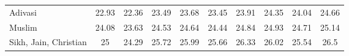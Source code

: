 \begin{table}[htbp]
\begin{tabular}{l*{9}{c}}
Adivasi             &       22.93&       22.36&       23.49&       23.68&       23.45&       23.91&       24.35&       24.04&       24.66\\
Muslim              &       24.08&       23.63&       24.53&       24.64&       24.44&       24.84&       24.93&       24.71&       25.14\\
Sikh, Jain, Christian&          25&       24.29&       25.72&       25.99&       25.66&       26.33&       26.02&       25.54&        26.5\\
\hline\hline
\end{tabular}
\end{table}
